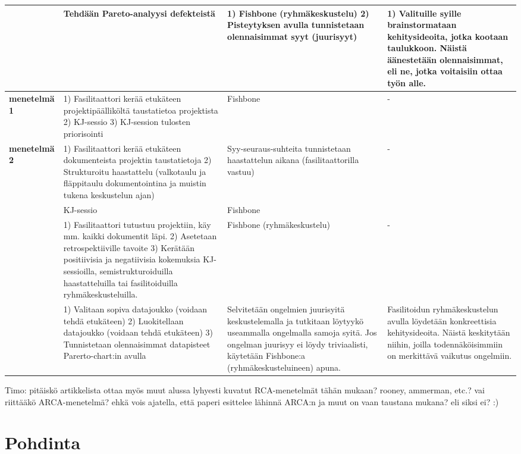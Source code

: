 \begin{center}
\begin{longtable}{|p{3cm}|p{4cm}|p{4cm}|p{4cm}|}
	\textbf{\citep{staalhane2004root}} & Tehdään Pareto-analyysi defekteistä & 1) Fishbone (ryhmäkeskustelu) 2) Pisteytyksen avulla tunnistetaan olennaisimmat syyt (juurisyyt) & 1) Valituille syille brainstormataan kehitysideoita, jotka kootaan taulukkoon. Näistä äänestetään olennaisimmat, eli ne, jotka voitaisiin ottaa työn alle. \\ \hline
	\textbf{\citep{staalhane2003post} menetelmä 1} & 1) Fasilitaattori kerää etukäteen projektipäälliköltä taustatietoa projektista 2) KJ-sessio 3) KJ-session tulosten priorisointi & Fishbone & - \\ \hline
	\textbf{\citep{staalhane2003post} menetelmä 2} & 1) Fasilitaattori kerää etukäteen dokumenteista projektin taustatietoja 2) Strukturoitu haastattelu (valkotaulu ja fläppitaulu dokumentointina ja muistin tukena keskustelun ajan) & Syy-seuraus-suhteita tunnistetaan haastattelun aikana (fasilitaattorilla vastuu) & - \\ \hline
	\textbf{\citep{dingsoyr2003extending}} & KJ-sessio & Fishbone &  \\ \hline
	\textbf{\citep{birk2002postmortem}} & 1) Fasilitaattori tutustuu projektiin, käy mm. kaikki dokumentit läpi. 2) Asetetaan retrospektiiville tavoite 3) Kerätään positiivisia ja negatiivisia kokemuksia KJ-sessioilla,  semistrukturoiduilla haastatteluilla tai fasilitoiduilla ryhmäkeskusteluilla. & Fishbone (ryhmäkeskustelu) & - \\ \hline
	\textbf{\citep{card1998learning}} & 1) Valitaan sopiva datajoukko (voidaan tehdä etukäteen) 2) Luokitellaan datajoukko (voidaan tehdä etukäteen) 3) Tunnistetaan olennaisimmat datapisteet Parerto-chart:in avulla & Selvitetään ongelmien juurisyitä keskustelemalla ja tutkitaan löytyykö useammalla ongelmalla samoja syitä. Jos ongelman juurisyy ei löydy triviaalisti, käytetään Fishbone:a (ryhmäkeskusteluineen) apuna. & Fasilitoidun ryhmäkeskustelun avulla löydetään konkreettisia kehitysideoita. Näistä keskitytään niihin, joilla todennäköisimmiin on merkittävä vaikutus ongelmiin. \\ \hline
\end{longtable}
\end{center}

Timo: pitäiskö \citep{Lehtinen2011} artikkelista ottaa myös muut alussa lyhyesti kuvatut RCA-menetelmät tähän mukaan? rooney, ammerman, etc.? vai riittääkö ARCA-menetelmä? ehkä vois ajatella, että paperi esittelee lähinnä ARCA:n ja muut on vaan taustana mukana? eli siksi ei? :)


\section{Pohdinta}

